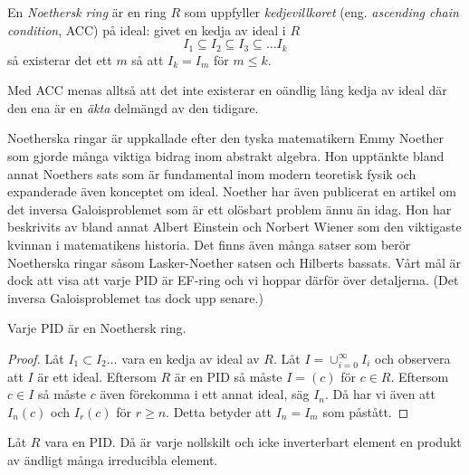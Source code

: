 \documentclass{article}
\theoremstyle{definition}
\begin{document}
\begin{mydef}{}{}
  En \textit{Noethersk ring} är en ring $R$ som uppfyller \textit{kedjevillkoret} (eng. \textit{ascending chain condition}, ACC)
  på ideal: givet en kedja av ideal i $R$
  \[ I_1 \subseteq I_2 \subseteq I_3 \subseteq \ldots I_k\]
  så existerar det ett $m$ så att $I_k = I_m$ för $m \leq k$.
\end{mydef}
Med ACC menas alltså att det inte existerar en oändlig lång kedja av ideal där den ena är en \textit{äkta} delmängd av den tidigare. 

Noetherska ringar 
är uppkallade efter den tyska matematikern Emmy Noether som gjorde många viktiga bidrag inom abstrakt algebra. Hon upptänkte bland annat 
Noethers sats som är fundamental inom modern teoretisk fysik och expanderade även konceptet om ideal. 
Noether har även publicerat en artikel om det inversa Galoisproblemet som är ett olösbart problem ännu än idag. Hon har beskrivits av bland annat 
Albert Einstein och Norbert Wiener som den viktigaste kvinnan i matematikens historia. Det finns även många satser som berör Noetherska ringar
såsom Lasker-Noether satsen och Hilberts bassats. Vårt mål är dock att visa att varje PID är EF-ring och vi hoppar därför över detaljerna. 
(Det inversa Galoisproblemet tas dock upp senare.)

\hypertarget{pidnoe}{}
\begin{mytheo}{}{}
  Varje PID är en Noethersk ring. 
\end{mytheo}

\begin{proof}
  Låt $I_1 \subset I_2 \ldots$ vara en kedja av ideal av $R$. Låt $I = \cup_{i = 0}^{\infty} I_i$ och observera att $I$ är ett ideal. Eftersom 
  $R$ är en PID så måste $I = (c)$ för $c \in R$. Eftersom $c \in I$ så måste $c$ även förekomma i ett annat ideal, säg $I_n.$ Då har vi även 
  att $I_n(c)$ och $I_r(c)$ för $r \geq n$. Detta betyder att $I_n = I_m$ som påstått. 
\end{proof}

\hypertarget{inv}{}
\begin{mytheo}{}{}
  Låt $R$ vara en PID. Då är varje nollskilt och icke inverterbart element en produkt av ändligt många irreducibla element.
\end{mytheo}
\end{document}
